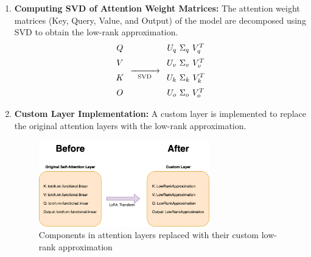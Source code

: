         \begin{enumerate}
            \item \textbf{Computing SVD of Attention Weight Matrices:} The attention weight matrices (Key, Query, Value, and Output) of the model are decomposed using SVD to obtain the low-rank approximation.
            \[
            \begin{array}{c}
                Q \\[0.2cm] %
                V \\[0.2cm] %
                K \\[0.2cm]
                O
            \end{array}
            \xrightarrow[\text{SVD}]{\hspace*{1cm}}
            \begin{array}{c}
                U_q \ \Sigma_q \ V_q^T \\[0.2cm] %
                U_v \ \Sigma_v \ V_v^T \\[0.2cm] %
                U_k \ \Sigma_k \ V_k^T \\[0.2cm]
                U_o \ \Sigma_o \ V_o^T

            \end{array}
            \]

            \item \textbf{Custom Layer Implementation:} A custom layer is implemented to replace the original attention layers with the low-rank approximation.
            \begin{figure}[H]
                \centering
                \includegraphics[width=0.7\textwidth]{figs/before-after.png}
                \caption{Components in attention layers replaced with their custom low-rank approximation}
                \label{fig:lora_implementation}
            \end{figure}
        \end{enumerate}
        
